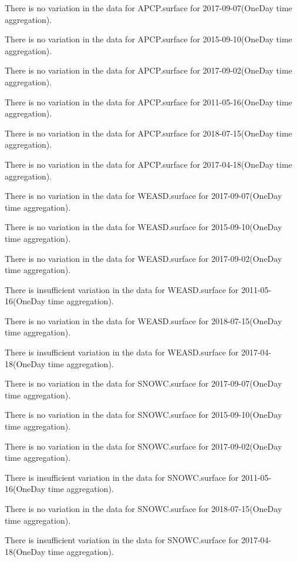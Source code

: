 There is no variation in the data for APCP.surface for 2017-09-07(OneDay time aggregation). 
 

There is no variation in the data for APCP.surface for 2015-09-10(OneDay time aggregation). 
 

There is no variation in the data for APCP.surface for 2017-09-02(OneDay time aggregation). 
 

There is no variation in the data for APCP.surface for 2011-05-16(OneDay time aggregation). 
 

There is no variation in the data for APCP.surface for 2018-07-15(OneDay time aggregation). 
 

There is no variation in the data for APCP.surface for 2017-04-18(OneDay time aggregation). 
 

There is no variation in the data for WEASD.surface for 2017-09-07(OneDay time aggregation). 
 

There is no variation in the data for WEASD.surface for 2015-09-10(OneDay time aggregation). 
 

There is no variation in the data for WEASD.surface for 2017-09-02(OneDay time aggregation). 
 

There is insufficient variation in the data for WEASD.surface for 2011-05-16(OneDay time aggregation). 
 

There is no variation in the data for WEASD.surface for 2018-07-15(OneDay time aggregation). 
 

There is insufficient variation in the data for WEASD.surface for 2017-04-18(OneDay time aggregation). 
 

There is no variation in the data for SNOWC.surface for 2017-09-07(OneDay time aggregation). 
 

There is no variation in the data for SNOWC.surface for 2015-09-10(OneDay time aggregation). 
 

There is no variation in the data for SNOWC.surface for 2017-09-02(OneDay time aggregation). 
 

There is insufficient variation in the data for SNOWC.surface for 2011-05-16(OneDay time aggregation). 
 

There is no variation in the data for SNOWC.surface for 2018-07-15(OneDay time aggregation). 
 

There is insufficient variation in the data for SNOWC.surface for 2017-04-18(OneDay time aggregation). 
 

